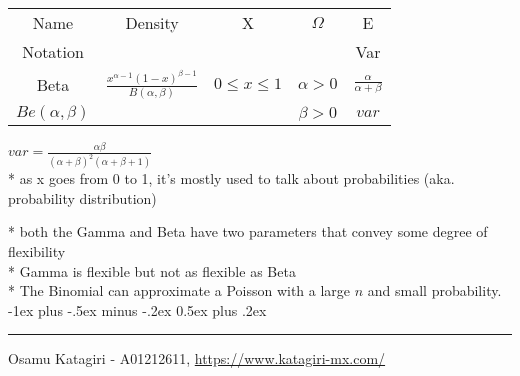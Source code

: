 \documentclass[10pt,landscape]{article}
\makeatletter
\renewcommand{\section}{\@startsection{section}{1}{0mm}%
                                {-1ex plus -.5ex minus -.2ex}%
                                {0.5ex plus .2ex}%
                                {\normalfont\large\bfseries}}
\makeatother
\begin{document}
\begin{multicols}{3}
\begin{center}
\begin{tabular}{ |ccccc| }
\hline
Name & Density & X & $\Omega$ & E \\
Notation &  &  &  & Var \\
\hline
Beta & $\frac{x^{\alpha - 1} (1 - x)^{\beta - 1}}{B(\alpha,\beta)}$ & $0 \leq x \leq 1$ & $\alpha > 0$ & $\frac{\alpha}{\alpha + \beta}$ \\
$Be(\alpha,\beta)$ &  &  & $\beta > 0$ & $var$ \\
\hline
\end{tabular}
\end{center}
$var = \frac{\alpha \beta}{(\alpha + \beta)^2 (\alpha + \beta + 1)}$ \\
* as x goes from 0 to 1, it's mostly used to talk about probabilities (aka. probability distribution)

\medskip
* both the Gamma and Beta have two parameters that convey some degree of flexibility \\
* Gamma is flexible but not as flexible as Beta \\
* The Binomial can approximate a Poisson with a large $n$ and small probability. \\

\section{} %
\hrule
Osamu Katagiri - A01212611, \href{https://www.katagiri-mx.com/}{https://www.katagiri-mx.com/}
\end{multicols}
\end{document}
